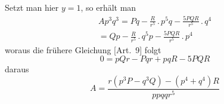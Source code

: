 Setzt man hier \(y=1\), so erhält man
\[
\begin{gathered}
Ap^3q^3=Pq-\frac{R}{r^5}\, .\,p^5q
-\frac{5PQR}{r^5}\, .\,q^4\\[8pt]
=Qp-\frac{R}{r^5}\, .\,q^5p
-\frac{5PQR}{r^5}\, .\,p^4
\end{gathered}
\]
woraus die frühere Gleichung [Art.\ 9] folgt
\[
0=pQr-Pqr+pqR-5PQR
\]
daraus
\[
A=\frac{r(p^3P-q^3Q)-(p^4+q^4)R}{ppqqr^5}
\]
\clearpage
\endgroup
